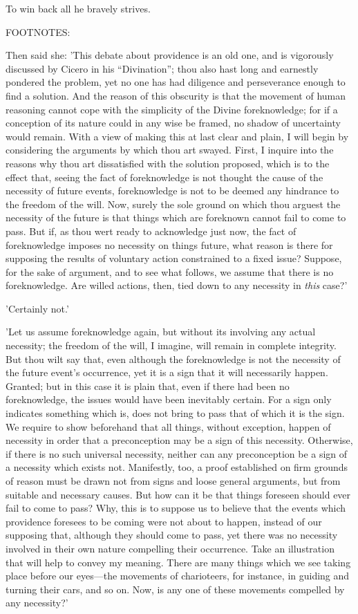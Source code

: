 To win back all he bravely strives.

FOOTNOTES:


Then said she: 'This debate about providence is an old one, and is
vigorously discussed by Cicero in his ``Divination''; thou also hast long
and earnestly pondered the problem, yet no one has had diligence and
perseverance enough to find a solution. And the reason of this obscurity
is that the movement of human reasoning cannot cope with the simplicity
of the Divine foreknowledge; for if a conception of its nature could in
any wise be framed, no shadow of uncertainty would remain. With a view
of making this at last clear and plain, I will begin by considering the
arguments by which thou art swayed. First, I inquire into the reasons
why thou art dissatisfied with the solution proposed, which is to the
effect that, seeing the fact of foreknowledge is not thought the cause
of the necessity of future events, foreknowledge is not to be deemed any
hindrance to the freedom of the will. Now, surely the sole ground on
which thou arguest the necessity of the future is that things which are
foreknown cannot fail to come to pass. But if, as thou wert ready to
acknowledge just now, the fact of foreknowledge imposes no necessity on
things future, what reason is there for supposing the results of
voluntary action constrained to a fixed issue? Suppose, for the sake of
argument, and to see what follows, we assume that there is no
foreknowledge. Are willed actions, then, tied down to any necessity in
\emph{this} case?'

'Certainly not.'

'Let us assume foreknowledge again, but without its involving any actual
necessity; the freedom of the will, I imagine, will remain in complete
integrity. But thou wilt say that, even although the foreknowledge is
not the necessity of the future event's occurrence, yet it is a sign
that it will necessarily happen. Granted; but in this case it is plain
that, even if there had been no foreknowledge, the issues would have
been inevitably certain. For a sign only indicates something which is,
does not bring to pass that of which it is the sign. We require to show
beforehand that all things, without exception, happen of necessity in
order that a preconception may be a sign of this necessity. Otherwise,
if there is no such universal necessity, neither can any preconception
be a sign of a necessity which exists not. Manifestly, too, a proof
established on firm grounds of reason must be drawn not from signs and
loose general arguments, but from suitable and necessary causes. But how
can it be that things foreseen should ever fail to come to pass? Why,
this is to suppose us to believe that the events which providence
foresees to be coming were not about to happen, instead of our supposing
that, although they should come to pass, yet there was no necessity
involved in their own nature compelling their occurrence. Take an
illustration that will help to convey my meaning. There are many things
which we see taking place before our eyes—the movements of charioteers,
for instance, in guiding and turning their cars, and so on. Now, is any
one of these movements compelled by any necessity?'

